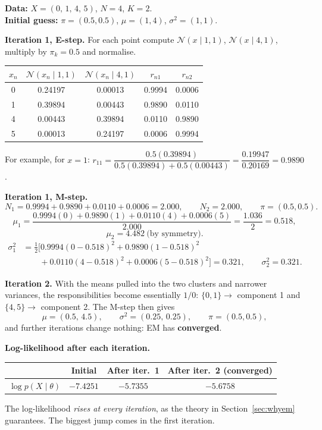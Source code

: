 \documentclass[11pt,a4paper]{article}
\newcommand{\N}{\mathcal{N}}
\begin{document}
\begin{example}
\textbf{Data:} $X=(0,\,1,\,4,\,5)$, $N=4$, $K=2$.\\
\textbf{Initial guess:} $\pi=(0.5,0.5)$, $\mu=(1,4)$, $\sigma^2=(1,1)$.

\medskip
\textbf{Iteration 1, E-step.} For each point compute $\N(x\mid1,1)$, $\N(x\mid4,1)$, multiply by $\pi_k=0.5$ and normalise.
\begin{center}
\begin{tabular}{@{}ccccc@{}}
\toprule
$x_n$ & $\N(x_n\mid1,1)$ & $\N(x_n\mid4,1)$ & $r_{n1}$ & $r_{n2}$\\
\midrule
0 & 0.24197 & 0.00013 & 0.9994 & 0.0006\\
1 & 0.39894 & 0.00443 & 0.9890 & 0.0110\\
4 & 0.00443 & 0.39894 & 0.0110 & 0.9890\\
5 & 0.00013 & 0.24197 & 0.0006 & 0.9994\\
\bottomrule
\end{tabular}
\end{center}
For example, for $x=1$: $r_{11}=\dfrac{0.5(0.39894)}{0.5(0.39894)+0.5(0.00443)}=\dfrac{0.19947}{0.20169}=0.9890$.

\textbf{Iteration 1, M-step.}
\[
N_1=0.9994+0.9890+0.0110+0.0006=2.000,\qquad N_2=2.000,\qquad \pi=(0.5,0.5).
\]
\[
\mu_1=\frac{0.9994(0)+0.9890(1)+0.0110(4)+0.0006(5)}{2.000}=\frac{1.036}{2}=0.518,
\]
\[
\mu_2=4.482\ \text{(by symmetry)}.
\]
\begin{align*}
\sigma_1^2&=\tfrac{1}{2}\big[0.9994(0-0.518)^2+0.9890(1-0.518)^2\\
&\qquad+0.0110(4-0.518)^2+0.0006(5-0.518)^2\big]=0.321,\qquad\sigma_2^2=0.321.
\end{align*}

\textbf{Iteration 2.} With the means pulled into the two clusters and narrower variances, the responsibilities become essentially $1/0$: $\{0,1\}\to$ component 1 and $\{4,5\}\to$ component 2. The M-step then gives
\[
\mu=(0.5,\,4.5),\qquad\sigma^2=(0.25,\,0.25),\qquad \pi=(0.5,0.5),
\]
and further iterations change nothing: EM has \textbf{converged}.

\textbf{Log-likelihood after each iteration.}
\begin{center}
\begin{tabular}{@{}lccc@{}}
\toprule
& Initial & After iter.\ 1 & After iter.\ 2 (converged)\\
\midrule
$\log p(X\mid\theta)$ & $-7.4251$ & $-5.7355$ & $-5.6758$\\
\bottomrule
\end{tabular}
\end{center}
The log-likelihood \emph{rises at every iteration}, as the theory in Section~\ref{sec:whyem} guarantees. The biggest jump comes in the first iteration.
\end{example}
\end{document}
